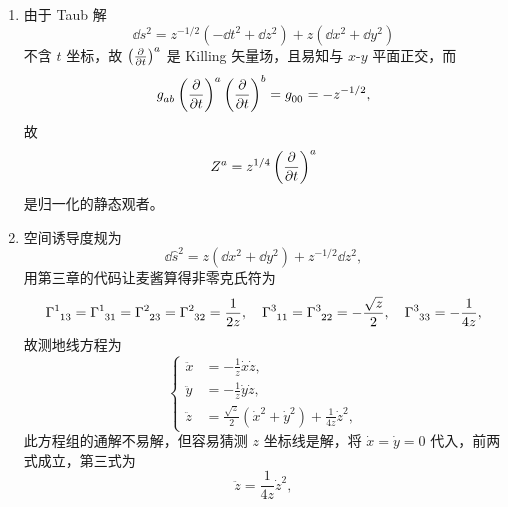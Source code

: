 \begin{xiti}
	\begin{jie}
		\begin{enumerate}[label=(\alph*)]
			\item 由于 Taub 解
			\begin{equation*}
				\dd{s}^2 = z^{-1/2} \left( -\dd{t}^2 + \dd{z}^2 \right) + z \left( \dd{x}^2 + \dd{y}^2 \right)
			\end{equation*}
			不含 $t$ 坐标，故 $\tensor{\left( \pdv{t} \right)}{^a}$ 是 Killing 矢量场，且易知与 $x$-$y$ 平面正交，而
			\begin{equation*}
				\tensor{g}{_a_b} \tensor{\left( \pdv{t} \right)}{^a} \tensor{\left( \pdv{t} \right)}{^b} = \tensor{g}{_0_0} = - z^{-1/2},
			\end{equation*}
			故
			\begin{equation*}
				\tensor{Z}{^a} = z^{1/4} \tensor{\left( \pdv{t} \right)}{^a}
			\end{equation*}
			是归一化的静态观者。
			\item 空间诱导度规为
			\begin{equation*}
				\dd{\hat{s}}^2 = z\left( \dd{x}^2 + \dd{y}^2 \right) + z^{-1/2} \dd{z}^2,
			\end{equation*}
			用第三章的代码让麦酱算得非零克氏符为
			\begin{equation*}
				\ChristoffelSymbol{1}{1}{3} = \ChristoffelSymbol{1}{3}{1} = \ChristoffelSymbol{2}{2}{3} = \ChristoffelSymbol{2}{3}{2} = \frac{1}{2z} \qc \ChristoffelSymbol{3}{1}{1} = \ChristoffelSymbol{3}{2}{2} = - \frac{\sqrt{z}}{2} \qc \ChristoffelSymbol{3}{3}{3} = - \frac{1}{4z},
			\end{equation*}
			故测地线方程为
			\begin{equation*}
				\left\{
					\begin{aligned}
						\ddot{x} &= - \frac{1}{z} \dot{x} \dot{z},\\
						\ddot{y} &= - \frac{1}{z} \dot{y} \dot{z},\\
						\ddot{z} &= \frac{\sqrt{z}}{2} \left( \dot{x}^2 + \dot{y}^2 \right) + \frac{1}{4z} \dot{z}^2,
					\end{aligned}
				\right.
			\end{equation*}
			此方程组的通解不易解，但容易猜测 $z$ 坐标线是解，将 $\dot{x} = \dot{y} = 0$ 代入，前两式成立，第三式为
			\begin{equation*}
				\ddot{z} = \frac{1}{4z} \dot{z}^2,
			\end{equation*}

\end{enumerate}
\end{jie}
\end{xiti}
